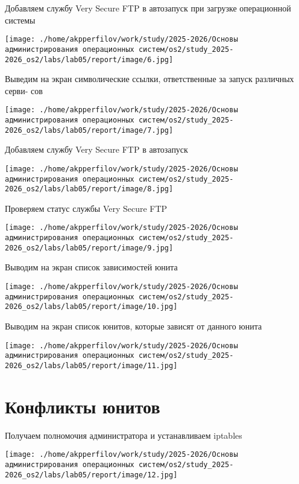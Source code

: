 \documentclass[
  english,
  russian,
  12pt,
  a4paper,
  DIV=11,
  numbers=noendperiod]{scrreprt}
\begin{document}
Добавляем службу Very Secure FTP в автозапуск при загрузке операционной
системы

\texttt{[image: ./home/akpperfilov/work/study/2025-2026/Основы администрирования операционных систем/os2/study\_2025-2026\_os2/labs/lab05/report/image/6.jpg]}

Выведим на экран символические ссылки, ответственные за запуск различных
серви- сов

\texttt{[image: ./home/akpperfilov/work/study/2025-2026/Основы администрирования операционных систем/os2/study\_2025-2026\_os2/labs/lab05/report/image/7.jpg]}

Добавляем службу Very Secure FTP в автозапуск

\texttt{[image: ./home/akpperfilov/work/study/2025-2026/Основы администрирования операционных систем/os2/study\_2025-2026\_os2/labs/lab05/report/image/8.jpg]}

Проверяем статус службы Very Secure FTP

\texttt{[image: ./home/akpperfilov/work/study/2025-2026/Основы администрирования операционных систем/os2/study\_2025-2026\_os2/labs/lab05/report/image/9.jpg]}

Выводим на экран список зависимостей юнита

\texttt{[image: ./home/akpperfilov/work/study/2025-2026/Основы администрирования операционных систем/os2/study\_2025-2026\_os2/labs/lab05/report/image/10.jpg]}

Выводим на экран список юнитов, которые зависят от данного юнита

\texttt{[image: ./home/akpperfilov/work/study/2025-2026/Основы администрирования операционных систем/os2/study\_2025-2026\_os2/labs/lab05/report/image/11.jpg]}

\chapter{Конфликты
юнитов}\label{ux43aux43eux43dux444ux43bux438ux43aux442ux44b-ux44eux43dux438ux442ux43eux432}

Получаем полномочия администратора и устанавливаем iptables

\texttt{[image: ./home/akpperfilov/work/study/2025-2026/Основы администрирования операционных систем/os2/study\_2025-2026\_os2/labs/lab05/report/image/12.jpg]}
\end{document}

